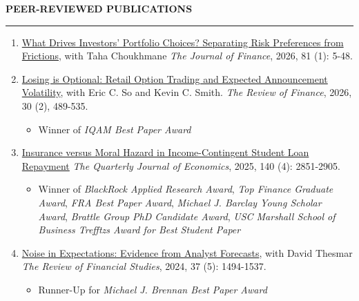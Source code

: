 \documentclass[a4paper, 10pt]{article}
\newcounter{mycounter}
\newcommand{\cvsec}[1]
{
	\needspace{4\baselineskip}
	\noindent \textbf{#1}
	
	\vspace{2pt}
	
	\hrule
	
	\bigskip
}
\newenvironment{cvcontinue}[1]
{
	\cvsec{#1}
	\begin{enumerate}
		\setcounter{enumi}{\themycounter}
	}
	{
	\setcounter{mycounter}{\theenumi}
	\end{enumerate}
}
\begin{document}
\begin{cvcontinue}{PEER-REVIEWED PUBLICATIONS}
	\item \href{https://www.timdesilva.me/files/papers/preferences_frictions.pdf}{What Drives Investors' Portfolio Choices? Separating Risk Preferences from Frictions}, with Taha Choukhmane \newline \emph{The Journal of Finance}, 2026, 81 (1): 5-48.
	\item \href{https://www.timdesilva.me/files/papers/losing_optional.pdf}{Losing is Optional: Retail Option Trading and Expected Announcement Volatility}, with Eric C. So and Kevin C. Smith.  \newline \emph{The Review of Finance}, 2026, 30 (2), 489-535.
	\begin{itemize}
		\item Winner of \emph{IQAM Best Paper Award}
	\end{itemize}
	\item \href{https://www.timdesilva.me/files/papers/jmp_deSilva.pdf}{Insurance versus Moral Hazard in Income-Contingent Student Loan Repayment} \newline \emph{The Quarterly Journal of Economics}, 2025, 140 (4): 2851-2905.
	\begin{itemize}
		\item Winner of \emph{BlackRock Applied Research Award}, \emph{Top Finance Graduate Award}, \emph{FRA Best Paper Award}, \emph{Michael J. Barclay Young Scholar Award}, \emph{Brattle Group PhD Candidate Award}, \emph{USC Marshall School of Business Trefftzs Award for Best Student Paper}
	\end{itemize}
	\item \href{https://www.timdesilva.me/files/papers/noise_expectations.pdf}{Noise in Expectations: Evidence from Analyst Forecasts}, with David Thesmar \newline \emph{The Review of Financial Studies}, 2024, 37 (5): 1494-1537.
	\begin{itemize}
		\item Runner-Up for \emph{Michael J. Brennan Best Paper Award}
	\end{itemize}
\end{cvcontinue}
\end{document}
